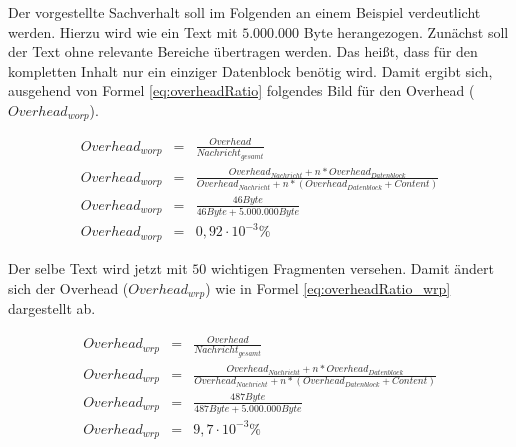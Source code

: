 Der vorgestellte Sachverhalt soll im Folgenden an einem Beispiel
verdeutlicht werden. Hierzu wird wie ein Text mit $5.000.000$ Byte herangezogen.
Zunächst soll der Text ohne relevante Bereiche übertragen werden. Das heißt,
dass für den kompletten Inhalt nur ein einziger Datenblock benötig wird. Damit
ergibt sich, ausgehend von Formel \ref{eq:overheadRatio} folgendes Bild für den
Overhead ($Overhead_{worp}$).


\begin{eqnarray} 
	Overhead_{worp} & = & \frac{Overhead}{Nachricht_{gesamt}}\\
	Overhead_{worp} & = & \frac{Overhead_{Nachricht} + n * Overhead_{Datenblock}}{Overhead_{Nachricht} + n * (Overhead_{Datenblock} + Content)}\\
	Overhead_{worp} & = & \frac{46 Byte}{46 Byte + 5.000.000 Byte} \\
	Overhead_{worp} & = & 0,92 \cdot 10^{-3} \%
	\label{eq:overheadRatio_worp}
\end{eqnarray}

Der selbe Text wird jetzt mit $50$ wichtigen Fragmenten versehen. Damit ändert
sich der Overhead ($Overhead_{wrp}$) wie in Formel \ref{eq:overheadRatio_wrp}
dargestellt ab.


\begin{eqnarray} 
	Overhead_{wrp} & = & \frac{Overhead}{Nachricht_{gesamt}}\\
	Overhead_{wrp} & = & \frac{Overhead_{Nachricht} + n * Overhead_{Datenblock}}{Overhead_{Nachricht} + n * (Overhead_{Datenblock} + Content)}\\
	Overhead_{wrp} & = & \frac{487 Byte}{487 Byte + 5.000.000 Byte} \\
	Overhead_{wrp} & = & 9,7 \cdot 10^{-3} \%
	\label{eq:overheadRatio_wrp}
\end{eqnarray}

